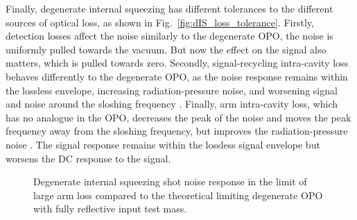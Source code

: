 Finally, degenerate internal squeezing has different tolerances to the different sources of optical loss, as shown in Fig.~\ref{fig:dIS_loss_tolerance}. %
Firstly, detection losses affect the noise similarly to the degenerate OPO, the noise is uniformly pulled towards the vacuum. But now the effect on the signal also matters, which is pulled towards zero. Secondly, signal-recycling intra-cavity loss behaves differently to the degenerate OPO, as the noise response remains within the lossless envelope, increasing radiation-pressure noise, and worsening signal and noise around the sloshing frequency . Finally, arm intra-cavity loss, which has no analogue in the OPO, decreases the peak of the noise and moves the peak frequency away from the sloshing frequency, but improves the radiation-pressure noise . The signal response remains within the lossless signal envelope but worsens the DC response to the signal.

\begin{figure}
	\centering
	\caption{Degenerate internal squeezing shot noise response in the limit of large arm loss compared to the theoretical limiting degenerate OPO with fully reflective input test mass.}
	\label{fig:dIS_limit_dOPO}
\end{figure}

